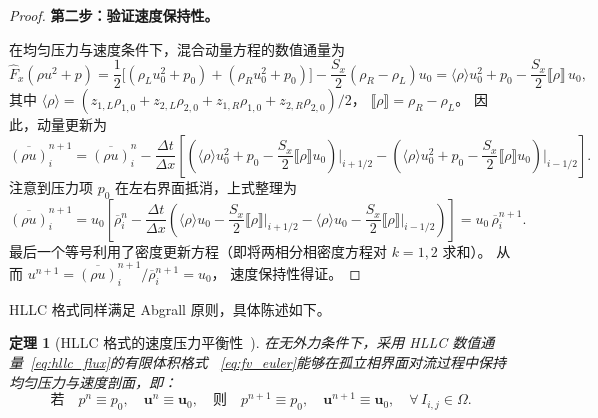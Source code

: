 \documentclass[12pt,a4paper]{article}
\newtheorem{theorem}{定理}[section]
\newcommand{\avg}[1]{\langle #1 \rangle}
\newcommand{\jump}[1]{\llbracket #1 \rrbracket}
\numberwithin{equation}{section}    %
\begin{document}
\begin{proof}
\textbf{第二步：验证速度保持性。}

在均匀压力与速度条件下，混合动量方程的数值通量为
\begin{equation}
    \hat{F}_x(\rho u^2 + p)
    = \frac{1}{2}\bigl[(\rho_L u_0^2 + p_0) + (\rho_R u_0^2 + p_0)\bigr]
    - \frac{S_x}{2}(\rho_R - \rho_L) u_0
    = \avg{\rho} u_0^2 + p_0 - \frac{S_x}{2}\jump{\rho}\, u_0,
\end{equation}
其中 $\avg{\rho} = (z_{1,L}\rho_{1,0} + z_{2,L}\rho_{2,0}
+ z_{1,R}\rho_{1,0} + z_{2,R}\rho_{2,0})/2$，
$\jump{\rho} = \rho_R - \rho_L$。
因此，动量更新为
\begin{equation}
    \overline{(\rho u)}_{i}^{n+1}
    = \overline{(\rho u)}_{i}^{n}
    - \frac{\Delta t}{\Delta x}
    \left[
        \left(\avg{\rho} u_0^2 + p_0 - \frac{S_x}{2}\jump{\rho} u_0\right)\bigg|_{i+1/2}
        - \left(\avg{\rho} u_0^2 + p_0 - \frac{S_x}{2}\jump{\rho} u_0\right)\bigg|_{i-1/2}
    \right].
\end{equation}
注意到压力项 $p_0$ 在左右界面抵消，上式整理为
\begin{equation}
    \overline{(\rho u)}_{i}^{n+1}
    = u_0 \left[
        \overline{\rho}_{i}^{n}
        - \frac{\Delta t}{\Delta x}
        \left(
            \avg{\rho} u_0 - \frac{S_x}{2}\jump{\rho}
        \bigg|_{i+1/2}
            -
            \avg{\rho} u_0 - \frac{S_x}{2}\jump{\rho}
        \bigg|_{i-1/2}
        \right)
    \right]
    = u_0\, \overline{\rho}_{i}^{n+1}.
\end{equation}
最后一个等号利用了密度更新方程（即将两相分相密度方程对 $k=1,2$ 求和）。
从而 $u^{n+1} = \overline{(\rho u)}_i^{n+1} / \overline{\rho}_i^{n+1} = u_0$，
速度保持性得证。
\end{proof}

HLLC 格式同样满足 Abgrall 原则，具体陈述如下。

\begin{theorem}[HLLC 格式的速度压力平衡性~\cite{zhang2025positivity}]
    \label{thm:hllc}
    在无外力条件下，采用 HLLC 数值通量~\eqref{eq:hllc_flux}的有限体积格式
    ~\eqref{eq:fv_euler}能够在孤立相界面对流过程中保持均匀压力与速度剖面，即：
    \begin{equation}
        \text{若}\quad p^n \equiv p_0,\quad \bm{u}^n \equiv \bm{u}_0,
        \quad\text{则}\quad
        p^{n+1} \equiv p_0,\quad \bm{u}^{n+1} \equiv \bm{u}_0,
        \quad \forall\, I_{i,j} \in \Omega.
    \end{equation}
\end{theorem}
\end{document}
